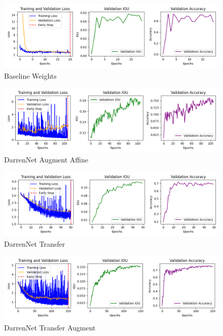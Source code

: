 \begin{figure}[H]
	\centering
	\includegraphics[width=\textwidth]{plots/baseline_weights}
	\caption{Baseline Weights}
	\label{fig:baseline_weights}
\end{figure}

\begin{figure}[H]
	\centering
	\includegraphics[width=\textwidth]{plots/darrennet_augment_affine}
	\caption{DarrenNet Augment Affine}
	\label{fig:darren_aug_aff}
\end{figure}

\begin{figure}[H]
	\centering
	\includegraphics[width=\textwidth]{plots/darrennet_transfer}
	\caption{DarrenNet Transfer}
	\label{fig:darren_transfer}
\end{figure}

\begin{figure}[H]
	\centering
	\includegraphics[width=\textwidth]{plots/darrennet_transfer_augment}
	\caption{DarrenNet Transfer Augment}
	\label{fig:darren_transfer_aug}
\end{figure}

